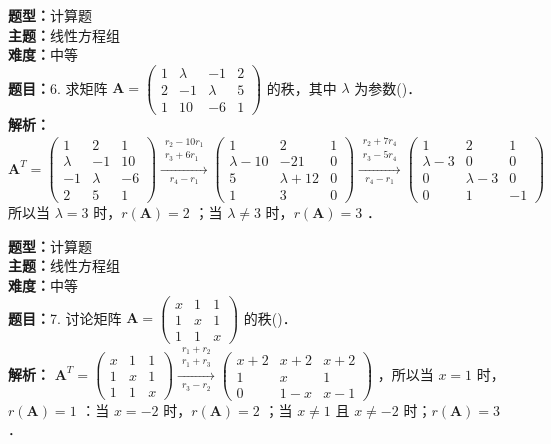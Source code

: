 \documentclass{ctexart}
\newenvironment{question}[5]{%
	\noindent\textbf{题型：}#1\\
	\textbf{主题：}#2\\
	\textbf{难度：}#3\\
	\textbf{题目：}#4\\
	\textbf{解析：}#5\\
	\vspace{1em}
}{}
\begin{document}
	
	\begin{question}
		{计算题}
		{线性方程组}
		{中等}
		{6. 求矩阵 \(\mathbf{A}=\left(\begin{array}{cccc}1 & \lambda & -1 & 2 \\ 2 & -1 & \lambda & 5 \\ 1 & 10 & -6 & 1\end{array}\right)\) 的秩，其中 \(\lambda\) 为参数(\qquad)．}
		{ \(\mathbf{A}^T=\left(\begin{array}{ccc}1 & 2 & 1 \\ \lambda & -1 & 10 \\ -1 & \lambda & -6 \\ 2 & 5 & 1\end{array}\right) \xrightarrow[r_4-r_1]{\substack{r_2-10 r_1 \\ r_3+6 r_1}}\left(\begin{array}{ccc}1 & 2 & 1 \\ \lambda-10 & -21 & 0 \\ 5 & \lambda+12 & 0 \\ 1 & 3 & 0\end{array}\right) \xrightarrow[r_4-r_1]{\substack{r_2+7 r_4 \\ r_3-5 r_4}} \left(\begin{array}{ccc}1 & 2 & 1 \\ \lambda-3 & 0 & 0 \\ 0 & \lambda-3 & 0 \\ 0 & 1 & -1\end{array}\right)\) 所以当 \(\lambda=3\) 时，\(r(\mathbf{A})=2\) ；当 \(\lambda \neq 3\) 时，\(r(\mathbf{A})=3\) ．}
	\end{question}
	
	\begin{question}
		{计算题}
		{线性方程组}
		{中等}
		{7. 讨论矩阵 \(\mathbf{A}=\left(\begin{array}{lll}x & 1 & 1 \\ 1 & x & 1 \\ 1 & 1 & x\end{array}\right)\) 的秩(\qquad)．}
		{ \(\mathbf{A}^T=\left(\begin{array}{lll}x & 1 & 1 \\ 1 & x & 1 \\ 1 & 1 & x\end{array}\right) \xrightarrow[r_3-r_2]{\substack{r_1+r_2 \\ r_1+r_3}}\left(\begin{array}{ccc}x+2 & x+2 & x+2 \\ 1 & x & 1 \\ 0 & 1-x & x-1\end{array}\right)\) ，所以当 \(x=1\) 时， \(r(\mathbf{A})=1\) ：当 \(x=-2\) 时，\(r(\mathbf{A})=2\) ；当 \(x \neq 1\) 且 \(x \neq-2\) 时；\(r(\mathbf{A})=3\) ．}
	\end{question}
	
\end{document}
